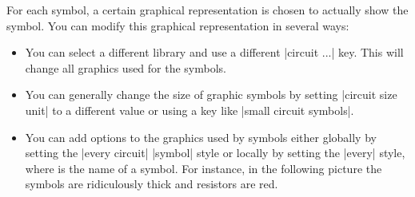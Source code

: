 For each symbol, a certain graphical representation is chosen to actually show
the symbol. You can modify this graphical representation in several ways:
%
\begin{itemize}
    \item You can select a different library and use a different |circuit ...|
        key. This will change all graphics used for the symbols.
    \item You can generally change the size of graphic symbols by setting
        |circuit size unit| to a different value or using a key like
        |small circuit symbols|.
    \item You can add options to the graphics used by symbols either globally
        by setting the |every circuit| |symbol| style or locally by setting the
        |every|  style, where  is the name of a symbol.
        For instance, in the following picture the symbols are ridiculously
        thick and resistors are red.
\begin{codeexample}[]
\begin{tikzpicture}
  [circuit ee IEC,
   every circuit symbol/.style={ultra thick},
   every resistor/.style={red}]


\end{tikzpicture}
\end{codeexample}
\end{itemize}
